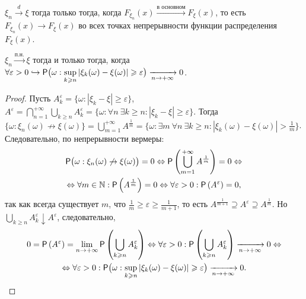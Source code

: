  \begin{theorem}[Александрова][б/д]
 	$\xi_n \xrightarrow{d} \xi$ тогда только тогда, когда 
 	$F_{\xi_n}(x) \xrightarrow{\text{в основном}} F_\xi (x)$, то есть 
 	$F_{\xi_n}(x) \rightarrow F_\xi(x)$ во всех точках непрерывности 
 	функции распределения $F_\xi(x)$. 
 \end{theorem}
 \begin{lemma}
 	$\xi_n \xrightarrow{\text{п.н.}} \xi$ тогда и только тогда, когда $\forall \varepsilon > 0 \hookrightarrow \mathsf{P} \big(\omega: \sup\limits_{k \geqslant n} | \xi_k(\omega) - \xi(\omega) | \geqslant \varepsilon \big) \xrightarrow[n \rightarrow + \infty]{} 0$.
 	\begin{proof}
 		Пусть $A_k^\varepsilon = 
 		\big\{ \omega: | \xi_k - \xi | \geqslant \varepsilon \big\}$, $A^\varepsilon = 
 		\bigcap\limits_{n=1}^{+\infty} \bigcup\limits_{k \geqslant n} A_k^\varepsilon = 
 		\big\{\omega: \forall n~ \exists k \geqslant n: |\xi_k - \xi| \geqslant \varepsilon \big\}$. 
 		Тогда $\big\{ \omega: \xi_n (\omega) \not\rightarrow \xi(\omega) \big\} = 
 		\bigcup\limits_{m=1}^{+\infty} A^{\frac{1}{m}} = 
 		\big\{\omega: \exists m~ \forall n~ \exists k \geqslant n: | \xi_k(\omega) - \xi(\omega) | > \frac{1}{m} \big\}$. Следовательно, по непрерывности вермеры: 
 		\begin{multline*}
 			\mathsf{P} \big( \omega: \xi_n(\omega) \not\rightarrow \xi(\omega) \big) = 0 \Leftrightarrow \mathsf{P} \left( \bigcup\limits_{m = 1}^{+\infty} A^{\frac{1}{m}} \right) = 0 \Leftrightarrow \\ \Leftrightarrow \forall m \in \mathbb{N} : \mathsf{P} \left( A^{\frac{1}{m}} \right) = 0  \Leftrightarrow \forall \varepsilon > 0 : \mathsf{P}  \left( A^\varepsilon \right) = 0,
 		\end{multline*}
 		так как всегда существует $m$, что $\frac{1}{m} \geqslant \varepsilon \geqslant \frac{1}{m+1}$, то есть $A^{\frac{1}{m+1}} \supseteq A^\varepsilon \supseteq A^{\frac{1}{m}}$. Но $\bigcup\limits_{k \geqslant n} A^\varepsilon_k \downarrow A^\varepsilon$, следовательно, 
 		\begin{multline*}
 			0 = \mathsf{P} \left( A^\varepsilon \right) = 
 			\lim\limits_{n \rightarrow + \infty} \mathsf{P} \left( \bigcup_{k \geqslant n} A^\varepsilon_k \right) \Leftrightarrow
 			\forall \varepsilon > 0 : \mathsf{P} \left( \bigcup\limits_{k \geqslant n} A^\varepsilon_k \right) \xrightarrow[n \rightarrow + \infty]{} 0 \Leftrightarrow \\ 
 			\Leftrightarrow  \forall \varepsilon > 0:  \mathsf{P} \big(\omega: \sup\limits_{k \geqslant n} | \xi_k(\omega) - \xi(\omega) | \geqslant \varepsilon \big) \xrightarrow[n \rightarrow + \infty]{} 0.
 		\end{multline*}
 	\end{proof}
 \end{lemma}
 
